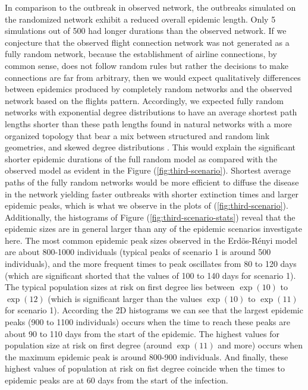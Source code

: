 \documentclass[10pt,a4paper]{article}
\begin{document}
%
In comparison to the outbreak in observed network, the outbreaks simulated on the randomized network exhibit a reduced overall epidemic length. Only 5 simulations out of 500 had longer durations than the observed network. 
%
If we conjecture that the observed flight connection network was not generated as a fully random network, because the establishment of airline connections, by common sense, does not follow random rules but rather the decisions to make connections are far from arbitrary, then we would expect qualitatively differences between epidemics produced by completely random networks and the observed network based on the flights pattern. 
% 
Accordingly, we expected fully random networks with exponential degree distributions to have an average shortest path lengths shorter than these path lengths found in natural networks with a more organized topology that bear a mix between structured and random link geometries, and skewed degree distributions \citep{mej2010networks,jackson2010social}. 
%
This would explain the significant shorter epidemic durations of the full random model as compared with the observed model as evident in the Figure (\ref{fig:third-scenario}). Shortest average paths of the fully random networks would be more efficient to diffuse the disease in the network yielding faster outbreaks with shorter extinction times and larger epidemic peaks, which is what we observe in the plots of (\ref{fig:third-scenario}). 
%
Additionally, the histograms of Figure (\ref{fig:third-scenario-stats}) reveal that the epidemic sizes are in general larger than any of the epidemic scenarios investigate here. The most common epidemic peak sizes observed in the Erd\"{o}s-R\'{e}nyi model are about 800-1000 individuals (typical peaks of scenario 1 is around 500 individuals), and the more frequent times to peak oscillates from 80 to 120 days (which are significant shorted that the values of 100 to 140 days for scenario 1). The typical population sizes at risk on first degree lies between $\exp(10)$ to $\exp(12)$ (which is significant larger than the values $\exp(10)$ to $\exp(11)$ for scenario 1). According the 2D histograms we can see that the largest epidemic peaks (900 to 1100 individuals) occurs when the time to reach these peaks are about 90 to 110 days from the start of the epidemic. The highest values for population size at risk on first degree (around $\exp(11)$ and more) occurs when the maximum epidemic peak is around 800-900 individuals. And finally, these highest values of population at risk on fist degree coincide when the times to epidemic peaks are at 60 days from the start of the infection.
\end{document}
